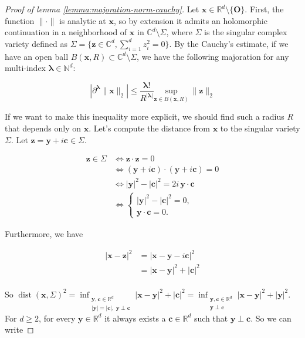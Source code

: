 ﻿\documentclass{article}
\begin{document}
\begin{proof}[Proof of lemma \ref{lemma:majoration-norm-cauchy}] Let $\bm x\in\mathbb R^d\setminus\{\bm O\}$. First, the function $\|\cdot\|$ is analytic at $\bm x$, so by extension it admits an holomorphic continuation in a neighborhood of $\bm x$ in $\mathbb C^d\setminus\Sigma$, where $\Sigma$ is the singular complex variety defined as $\Sigma = \{\bm z\in\mathbb C^d, \sum_{i=1}^{d}z_i^2 = 0\}$. By the Cauchy's estimate, if we have an open ball $B(\bm x, R)\subset\mathbb C^d\setminus\Sigma$, we have the following majoration for any multi-index $\bm\lambda\in\mathbb N^d$:

\begin{equation}\label{eq:cauchy-estimate}
  \left|\partial^{\bm\lambda}\|\bm x\|_2\right| \leq \frac{\bm\lambda !}{R^{|\bm\lambda|}}\underset{\bm z\in B(\bm x, R)}{\text{sup}}\,\|\bm z\|_2
\end{equation}

If we want to make this inequality more explicit, we should find such a radius $R$ that depends only on $\bm x$. Let's compute the distance from $\bm x$ to the singular variety $\Sigma$. Let $\bm z=\bm y+i\bm c\in\Sigma$.

\begin{align*}
  \bm z\in \Sigma
  &\Longleftrightarrow \bm z\cdot\bm z = 0 \\
  &\Longleftrightarrow (\bm y + i\bm c)\cdot(\bm y + i\bm c) = 0 \\
  &\Longleftrightarrow |\bm y|^2 - |\bm c|^2 = 2i\,\bm y\cdot\bm c \\
  &\Longleftrightarrow
  \begin{cases}
    |\bm y|^2 - |\bm c|^2 = 0,\\
    \bm y\cdot\bm c = 0.
  \end{cases}
\end{align*}

Furthermore, we have

\begin{align*}
  |\bm x -\bm z|^2 & = |\bm x - \bm y - i \bm c|^2 \\
  & = |\bm x - \bm y|^2 + |\bm c|^2 \\
\end{align*}

So $\displaystyle{
  \operatorname{dist}(\bm x,\Sigma)^2
  =
  \inf_{\substack{
  \bm y,\bm c\in\mathbb R^d\\
  |\bm y|=|\bm c|,\ \bm y\perp\bm c
  }}
  |\bm x-\bm y|^2+|\bm c|^2
} = \inf_{\substack{
  \bm y,\bm c\in\mathbb R^d\\
  \bm y\perp\bm c
  }}
  |\bm x-\bm y|^2+|\bm y|^2
$. For $d\geq 2$, for every $\bm y\in\mathbb R^d$ it always exists a $\bm c\in\mathbb R^d$ such that $\bm y\perp\bm c$. So we can write


\end{proof}
\end{document}
